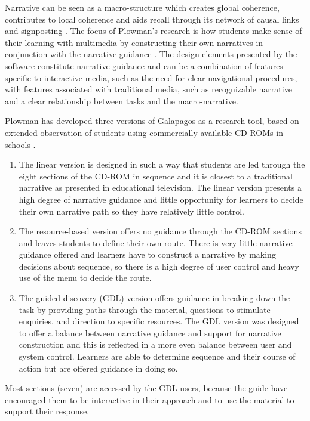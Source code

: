 \documentclass{egpubl}
\begin{document}
Narrative can be seen as a macro-structure which creates global coherence, contributes to local
coherence and aids recall through its network of causal links and signposting \cite{plowman1999}. 
The focus of Plowman's research is how students make sense of their learning with multimedia by constructing their own narratives in conjunction with the narrative guidance \cite{plowman1999}. The design elements presented by the software constitute
narrative guidance and can be a combination of features specific to interactive media, such as the need for clear navigational procedures, with features associated with traditional media, such as recognizable narrative and a clear relationship between tasks and the macro-narrative. 


Plowman has developed three versions of Galapagos as a research tool, based on extended observation of students using commercially available CD-ROMs in schools \cite{plowman1999}.
\begin{enumerate}
\item The linear version is designed in such a way that students are led through the eight sections of the CD-ROM in sequence and it is closest to a traditional narrative as presented in educational television.  The linear version presents a high degree of narrative guidance and little opportunity for learners to decide their own narrative path so they have relatively little control.
\item The resource-based version offers no guidance through the CD-ROM sections and leaves students to define their own route. There is very
little narrative guidance offered and learners have to construct a narrative by making decisions about sequence, so there is a high degree of user control and heavy use of the menu to decide the route. 
\item The guided discovery (GDL) version offers guidance in breaking down the task by providing paths through the material, questions to stimulate enquiries, and direction to specific resources. The GDL version was designed to offer a balance between narrative guidance and support for narrative construction and this is reflected in a more even balance between user and system control. Learners are able to determine sequence and their course of action but are offered guidance in doing so. 
\end{enumerate}
Most sections (seven) are accessed by the GDL users, because the guide have encouraged them to be interactive in their approach and to use the material to support their response. 
\end{document}

